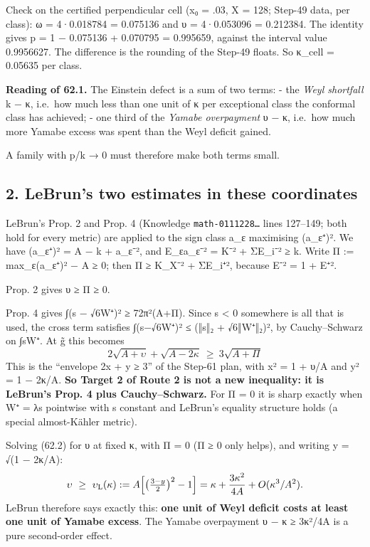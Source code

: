 \documentclass[
  10pt,
]{report}
\begin{document}
Check on the certified perpendicular cell (x₀ = .03, X = 128; Step-49
data, per class): ω = 4·0.018784 = 0.075136 and υ = 4·0.053096 =
0.212384. The identity gives p = 1 − 0.075136 + 0.070795 = 0.995659,
against the interval value 0.9956627. The difference is the rounding of
the Step-49 floats. So κ\_cell = 0.05635 per class.

\textbf{Reading of 62.1.} The Einstein defect is a sum of two terms: -
the \emph{Weyl shortfall} k − κ, i.e.~how much less than one unit of κ
per exceptional class the conformal class has achieved; - one third of
the \emph{Yamabe overpayment} υ − κ, i.e.~how much more Yamabe excess
was spent than the Weyl deficit gained.

A family with p/k → 0 must therefore make both terms small.

\hypertarget{lebruns-two-estimates-in-these-coordinates}{%
\subsection{2. LeBrun's two estimates in these
coordinates}\label{lebruns-two-estimates-in-these-coordinates}}

LeBrun's Prop. 2 and Prop. 4 (Knowledge \texttt{math-0111228\ldots{}}
lines 127--149; both hold for every metric) are applied to the sign
class a\_ε maximising (a\_ε⁺)². We have (a\_ε⁺)² = A − k +
\textbar a\_ε⁻\textbar², and E\_ε\textbar a\_ε⁻\textbar² =
\textbar K⁻\textbar² + Σ\textbar E\_i⁻\textbar² ≥ k. Write Π :=
max\_ε(a\_ε⁺)² − A ≥ 0; then Π ≥ \textbar K\_X⁻\textbar² +
Σ\textbar E\_i⁺\textbar², because \textbar E⁻\textbar² = 1 +
\textbar E⁺\textbar².

Prop. 2 gives υ ≥ Π ≥ 0.

Prop. 4 gives ∫(s − √6\textbar W⁺\textbar)² ≥ 72π²(A+Π). Since s
\textless{} 0 somewhere is all that is used, the cross term satisfies
∫(s−√6\textbar W⁺\textbar)² ≤ (‖s‖₂ + √6‖W⁺‖₂)², by Cauchy--Schwarz on
∫\textbar s\textbar\textbar W⁺\textbar. At g̃ this becomes \[
\boxed{\;2\sqrt{A+\upsilon}+\sqrt{A-2\kappa}\ \ge\ 3\sqrt{A+\Pi}\;}\tag{62.2}
\] This is the ``envelope 2x + y ≥ 3'' of the Step-61 plan, with x² = 1
+ υ/A and y² = 1 − 2κ/A. \textbf{So Target 2 of Route 2 is not a new
inequality: it is LeBrun's Prop. 4 plus Cauchy--Schwarz.} For Π = 0 it
is sharp exactly when \textbar W⁺\textbar{} = λ\textbar s\textbar{}
pointwise with s constant and LeBrun's equality structure holds (a
special almost-Kähler metric).

Solving (62.2) for υ at fixed κ, with Π = 0 (Π ≥ 0 only helps), and
writing y = √(1 − 2κ/A): \[
\upsilon\ \ge\ \upsilon_{\rm L}(\kappa):=A\Bigl[\bigl(\tfrac{3-y}{2}\bigr)^2-1\Bigr]=\kappa+\frac{3\kappa^2}{4A}+O(\kappa^3/A^2).
\] LeBrun therefore says exactly this: \textbf{one unit of Weyl deficit
costs at least one unit of Yamabe excess}. The Yamabe overpayment υ − κ
≥ 3κ²/4A is a pure second-order effect.
\end{document}
